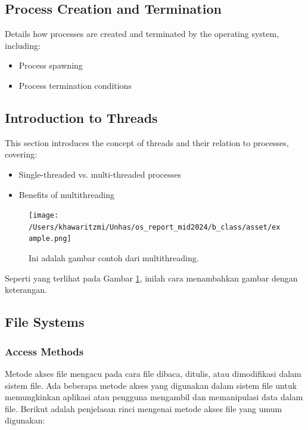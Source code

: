 \documentclass[12pt]{article}
\begin{document}
\subsection{Process Creation and Termination}
Details how processes are created and terminated by the operating system, including:
\begin{itemize}
    \item Process spawning
    \item Process termination conditions
\end{itemize}

\subsection{Introduction to Threads}
This section introduces the concept of threads and their relation to processes, covering:
\begin{itemize}
    \item Single-threaded vs. multi-threaded processes
    \item Benefits of multithreading
\end{itemize}

\begin{figure}[h]
    \centering
    \texttt{[image: /Users/khawaritzmi/Unhas/os\_report\_mid2024/b\_class/asset/example.png]}  %
    \caption{Ini adalah gambar contoh dari multithreading.}
    \label{fig:contoh_gambar}
\end{figure}

Seperti yang terlihat pada Gambar \ref{fig:contoh_gambar}, inilah cara menambahkan gambar dengan keterangan.

\subsection{File Systems}
\subsubsection{Access Methods}
Metode akses file mengacu pada cara file dibaca, ditulis, atau dimodifikasi dalam sistem file. Ada beberapa metode akses yang digunakan dalam sistem file untuk memungkinkan aplikasi atau pengguna mengambil dan memanipulasi data dalam file. Berikut adalah penjelasan rinci mengenai metode akses file yang umum digunakan:
\end{document}

